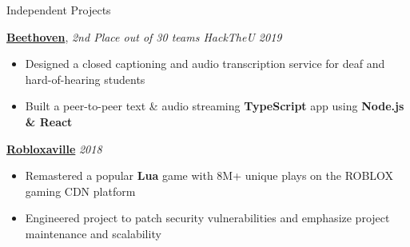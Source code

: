 \documentclass{resume/resume}
\begin{document}
\begin{rSection}{Independent Projects}
    
    \href{https://devpost.com/software/beethoven-t9ud86}{\bf Beethoven}, {\em 2nd Place out of 30 teams
    \hfill HackTheU 2019}
    \vspace{-6pt}
    \begin{itemize}[nosep]
        \item Designed a closed captioning and audio transcription service for deaf and hard-of-hearing students
        \item Built a peer-to-peer text \& audio streaming {\bf TypeScript} app using {\bf Node.js \& React}
    \end{itemize}

    \href{https://www.roblox.com/games/849680368/Robloxaville-Next-Generation-BETA}{\bf Robloxaville} \hfill {\em 2018}
    \vspace{-6pt}
    \begin{itemize}[nosep]
      \item Remastered a popular {\bf Lua} game with 8M+ unique plays on the ROBLOX gaming CDN platform
      \item Engineered project to patch security vulnerabilities and emphasize project maintenance and scalability
    \end{itemize}
    
    
    

\end{rSection}
\end{document}
